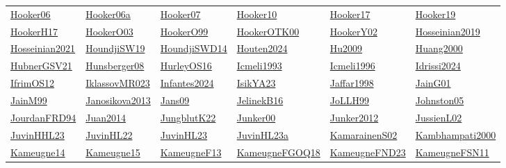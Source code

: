 \begin{longtable}{*{6}{l}}
\hyperref[detail:Hooker06]{Hooker06} & \hyperref[detail:Hooker06a]{Hooker06a} & \hyperref[detail:Hooker07]{Hooker07} & \hyperref[detail:Hooker10]{Hooker10} & \hyperref[detail:Hooker17]{Hooker17} & \hyperref[detail:Hooker19]{Hooker19}\\ 
\hyperref[detail:HookerH17]{HookerH17} & \hyperref[detail:HookerO03]{HookerO03} & \hyperref[detail:HookerO99]{HookerO99} & \hyperref[detail:HookerOTK00]{HookerOTK00} & \hyperref[detail:HookerY02]{HookerY02} & \hyperref[detail:Hosseinian2019]{Hosseinian2019}\\ 
\hyperref[detail:Hosseinian2021]{Hosseinian2021} & \hyperref[detail:HoundjiSW19]{HoundjiSW19} & \hyperref[detail:HoundjiSWD14]{HoundjiSWD14} & \hyperref[detail:Houten2024]{Houten2024} & \hyperref[detail:Hu2009]{Hu2009} & \hyperref[detail:Huang2000]{Huang2000}\\ 
\hyperref[detail:HubnerGSV21]{HubnerGSV21} & \hyperref[detail:Hunsberger08]{Hunsberger08} & \hyperref[detail:HurleyOS16]{HurleyOS16} & \hyperref[detail:Icmeli1993]{Icmeli1993} & \hyperref[detail:Icmeli1996]{Icmeli1996} & \hyperref[detail:Idrissi2024]{Idrissi2024}\\ 
\hyperref[detail:IfrimOS12]{IfrimOS12} & \hyperref[detail:IklassovMR023]{IklassovMR023} & \hyperref[detail:Infantes2024]{Infantes2024} & \hyperref[detail:IsikYA23]{IsikYA23} & \hyperref[detail:Jaffar1998]{Jaffar1998} & \hyperref[detail:JainG01]{JainG01}\\ 
\hyperref[detail:JainM99]{JainM99} & \hyperref[detail:Janosikova2013]{Janosikova2013} & \hyperref[detail:Jans09]{Jans09} & \hyperref[detail:JelinekB16]{JelinekB16} & \hyperref[detail:JoLLH99]{JoLLH99} & \hyperref[detail:Johnston05]{Johnston05}\\ 
\hyperref[detail:JourdanFRD94]{JourdanFRD94} & \hyperref[detail:Juan2014]{Juan2014} & \hyperref[detail:JungblutK22]{JungblutK22} & \hyperref[detail:Junker00]{Junker00} & \hyperref[detail:Junker2012]{Junker2012} & \hyperref[detail:JussienL02]{JussienL02}\\ 
\hyperref[detail:JuvinHHL23]{JuvinHHL23} & \hyperref[detail:JuvinHL22]{JuvinHL22} & \hyperref[detail:JuvinHL23]{JuvinHL23} & \hyperref[detail:JuvinHL23a]{JuvinHL23a} & \hyperref[detail:KamarainenS02]{KamarainenS02} & \hyperref[detail:Kambhampati2000]{Kambhampati2000}\\ 
\hyperref[detail:Kameugne14]{Kameugne14} & \hyperref[detail:Kameugne15]{Kameugne15} & \hyperref[detail:KameugneF13]{KameugneF13} & \hyperref[detail:KameugneFGOQ18]{KameugneFGOQ18} & \hyperref[detail:KameugneFND23]{KameugneFND23} & \hyperref[detail:KameugneFSN11]{KameugneFSN11}\\ 

\end{longtable}
